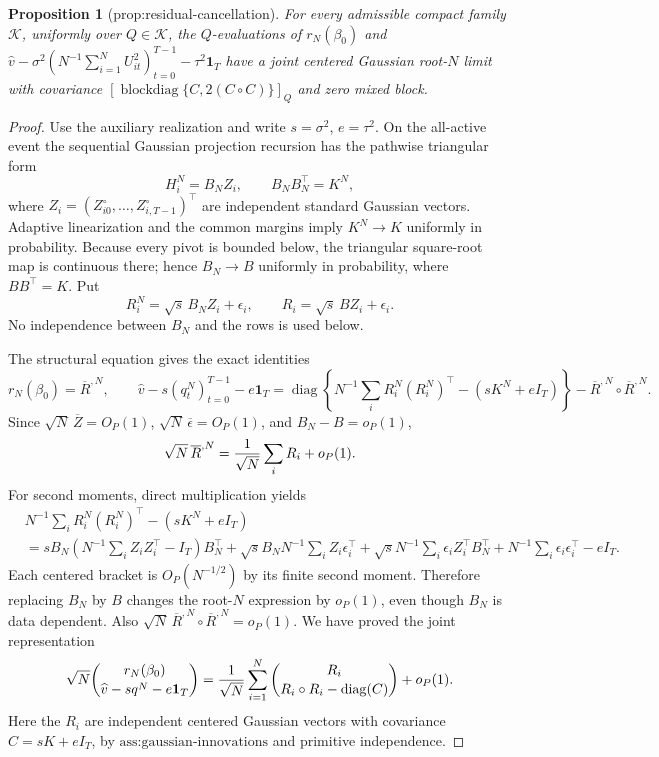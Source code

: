 \documentclass{article}
\newtheorem{proposition}{Proposition}
\begin{document}
\begin{proposition}[prop:residual-cancellation]\label{prop:residual-cancellation}
For every admissible compact family \(\mathcal K\), uniformly over \(Q\in\mathcal K\), the \(Q\)-evaluations of \(r_N(\beta_0)\) and \(\widehat v-\sigma^2(N^{-1}\sum_{i=1}^NU_{it}^2)_{t=0}^{T-1}-\tau^2\mathbf 1_T\) have a joint centered Gaussian root-\(N\) limit with covariance \([\operatorname{blockdiag}\{C,2(C\circ C)\}]_Q\) and zero mixed block.
\end{proposition}
\begin{proof}
Use the auxiliary realization and write \(s=\sigma^2\), \(e=\tau^2\).  On the all-active event the sequential Gaussian projection recursion has the pathwise triangular form
\[
 H_i^N=B_NZ_i,
 \qquad B_NB_N^{\top}=K^N,
\]
where \(Z_i=(Z_{i0}^{\circ},\ldots,Z_{i,T-1}^{\circ})^{\top}\) are independent standard Gaussian vectors.  Adaptive linearization and the common margins imply \(K^N\to K\) uniformly in probability.  Because every pivot is bounded below, the triangular square-root map is continuous there; hence \(B_N\to B\) uniformly in probability, where \(BB^{\top}=K\).  Put
\[
 R_i^N=\sqrt s\,B_NZ_i+\epsilon_i,
 \qquad R_i=\sqrt s\,BZ_i+\epsilon_i.
\]
No independence between \(B_N\) and the rows is used below.

The structural equation gives the exact identities
\[
 r_N(\beta_0)=\overline R^{,N},
 \qquad
 \widehat v- s(q_t^N)_{t=0}^{T-1}-e\mathbf 1_T
 =\operatorname{diag}\!\left\{N^{-1}\sum_iR_i^N(R_i^N)^{\top}-(sK^N+eI_T)\right\}
 -\overline R^{,N}\circ\overline R^{,N}.
\]
Since \(\sqrt N\,\overline Z=O_P(1)\), \(\sqrt N\,\overline\epsilon=O_P(1)\), and \(B_N-B=o_P(1)\),
\[
 \sqrt N\,\overline R^{,N}={1\over\sqrt N}\sum_iR_i+o_P(1).
\]
For second moments, direct multiplication yields
\[
 \begin{aligned}
 &N^{-1}\sum_iR_i^N(R_i^N)^{\top}-(sK^N+eI_T)\\
 &=sB_N\left(N^{-1}\sum_iZ_iZ_i^{\top}-I_T\right)B_N^{\top}
 +\sqrt s B_NN^{-1}\sum_iZ_i\epsilon_i^{\top}
 +\sqrt s N^{-1}\sum_i\epsilon_iZ_i^{\top}B_N^{\top}
 +N^{-1}\sum_i\epsilon_i\epsilon_i^{\top}-eI_T.
\end{aligned}
\]
Each centered bracket is \(O_P(N^{-1/2})\) by its finite second moment.  Therefore replacing \(B_N\) by \(B\) changes the root-\(N\) expression by \(o_P(1)\), even though \(B_N\) is data dependent.  Also \(\sqrt N\,\overline R^{,N}\circ\overline R^{,N}=o_P(1)\).  We have proved the joint representation
\[
 \sqrt N\binom{r_N(\beta_0)}{\widehat v-sq^N-e\mathbf1_T}
 ={1\over\sqrt N}\sum_{i=1}^N
 \binom{R_i}{R_i\circ R_i-\operatorname{diag}(C)}+o_P(1).
\]
Here the \(R_i\) are independent centered Gaussian vectors with covariance \(C=sK+eI_T\), by \(\text{ass:gaussian-innovations}\) and primitive independence.


\end{proof}
\end{document}
